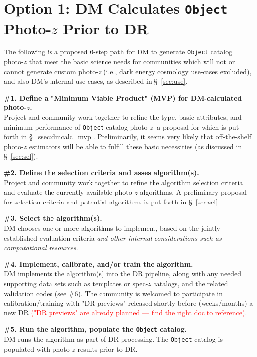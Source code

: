 \documentclass[DM,lsstdraft,toc]{lsstdoc}
\begin{document}
\clearpage
\section{Option 1: DM Calculates {\tt Object} Photo-$z$ Prior to DR}\label{sec:dmcalc}

The following is a proposed 6-step path for DM to generate {\tt Object} catalog photo-$z$ that meet the basic science needs for communities which will not or cannot generate custom photo-$z$ (i.e., dark energy cosmology use-cases excluded), and also DM's internal use-cases, as described in \S~\ref{sec:use}.

{\bf \#1. Define a "Minimum Viable Product" (MVP) for DM-calculated photo-$z$.}\\
Project and community work together to refine the type, basic attributes, and minimum performance of {\tt Object} catalog photo-$z$, a proposal for which is put forth in \S~\ref{ssec:dmcalc_mvp}.
Preliminarily, it seems very likely that off-the-shelf photo-$z$ estimators will be able to fulfill these basic necessities (as discussed in \S~\ref{sec:sel}).

{\bf \#2. Define the selection criteria and asses algorithm(s).}\\
Project and community work together to refine the algorithm selection criteria and evaluate the currently available photo-$z$ algorithms.
A preliminary proposal for selection criteria and potential algorithms is put forth in \S~\ref{sec:sel}.

{\bf \#3. Select the algorithm(s).}\\
DM chooses one or more algorithms to implement, based on the jointly established evaluation criteria {\it and other internal considerations such as computational resources}.

{\bf \#4. Implement, calibrate, and/or train the algorithm.}\\
DM implements the algorithm(s) into the DR pipeline, along with any needed supporting data sets such as templates or spec-$z$ catalogs, and the related validation codes (see \#6).
The community is welcomed to participate in calibration/training with "DR previews" released shortly before (weeks/months) a new DR \textcolor{red}{("DR previews" are already planned --- find the right doc to reference)}.

{\bf \#5. Run the algorithm, populate the {\tt Object} catalog.}\\
DM runs the algorithm as part of DR processing.
The {\tt Object} catalog is populated with photo-$z$ results prior to DR.
\end{document}
